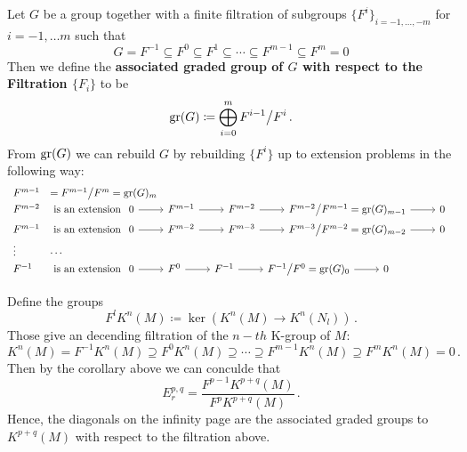 \begin{definition}
	Let $G$ be a group together with a finite filtration of subgroups $\{F^i\}_{i=-1,\dots,-m}$ for $i=-1,\dots m$ such that 
	\begin{equation*}
		G=F^{-1}\subseteq F^0 \subseteq F^1\subseteq \cdots \subseteq F^{m-1}\subseteq F^m=0
	\end{equation*}
	Then we define the \textbf{associated graded group of $G$ with respect to the Filtration $\{F_i\}$} to be 
	\begin{equation*}
		\operatorname{\mathrm{gr}}(G)\coloneq \bigoplus_{i=0}^{m} F^{i-1}\big/ F^{i}\, .
	\end{equation*} 
	From $\operatorname{\mathrm{gr}}(G)$ we can rebuild $G$ by rebuilding $\{F^i\}$ up to extension problems in the following way:
	\begin{equation*}
		\begin{array}{ll}
			F^{m-1} & =F^{m-1}\big/F^m=\gr(G)_m \\
			F^{m-2} &  \text{ is an extension } 
			\begin{tikzcd}
				0 \arrow[r] & F^{m-1} \arrow[r] & F^{m-2} \arrow[r] & F^{m-2}\big/F^{m-1}=\gr(G)_{m-1} \arrow[r] & 0
				\end{tikzcd}\\
		F^{m-1}&  \text{ is an extension } 
		\begin{tikzcd}
			0 \arrow[r] & F^{m-2} \arrow[r] & F^{m-3} \arrow[r] & F^{m-3}\big/F^{m-2}=\gr(G)_{m-2} \arrow[r] & 0
		\end{tikzcd} \\
		\vdots & \cdots\\
		F^{-1}&  \text{ is an extension } 
		\begin{tikzcd}
			0 \arrow[r] & F^{0} \arrow[r] & F^{-1} \arrow[r] & F^{-1}\big/F^{0}=\gr(G)_{0} \arrow[r] & 0
		\end{tikzcd}
		\end{array}
	\end{equation*}
\end{definition}




\begin{corollary}
	Define the groups
	\begin{equation*}
		F^lK^n(M)\coloneq \ker\left(K^{n}(M)\to K^n(N_l)\right)\,.
	\end{equation*} Those give an decending filtration of the $n-th$ K-group of $M$:
	\begin{equation*}
		K^n(M)=F^{-1}K^n(M)\supseteq F^{0}K^n(M)\supseteq \cdots \supseteq F^{m-1}K^n(M)\supseteq F^{m}K^n(M)=0\,.
	\end{equation*}
	Then by the corollary above we can conculde that
	\begin{equation*}
		E^{p,q}_r=\frac{F^{p-1}K^{p+q}(M)}{F^pK^{p+q}(M)}\,.
	\end{equation*} Hence, the diagonals on the infinity page are the associated graded groups to $K^{p+q}(M)$ with respect to the filtration above.
\end{corollary}

